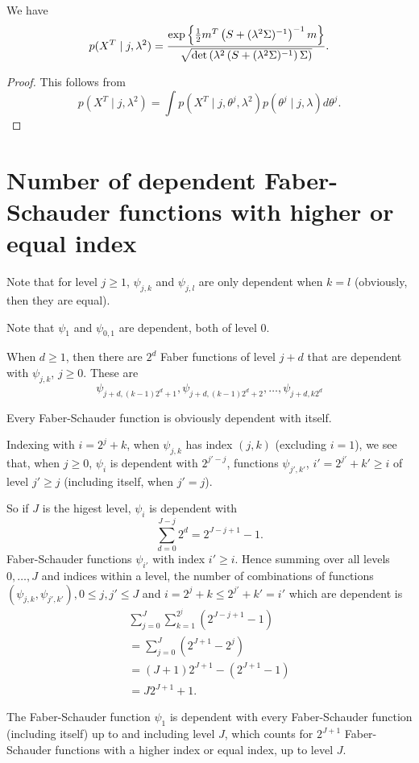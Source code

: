 \documentclass[12pt]{article}
\begin{document}
\begin{lemma}
	We have \[
	p(X^T\mid j,\lambda^2)= \frac{\exp\left\{ \frac12 m^T \left( S+(\lambda^2 \Sigma)^{-1} \right)^{-1}m \right\}}{\sqrt{\det\left( \lambda^2\left( S+(\lambda^2 \Sigma)^{-1} \right)\Sigma \right)}}.
	\]
\end{lemma}
\begin{proof}
	This follows from \[
	p(X^T\mid j,\lambda^2 ) = \int p(X^T\mid j,\theta^j,\lambda^2)p(\theta^j\mid j, \lambda)d\theta^j.
	\]
\end{proof}
\section{Number of dependent Faber-Schauder functions with higher or equal index}

Note that for level \(j\ge 1\), \(\psi_{j,k}\) and \(\psi_{j,l}\) are only dependent when \(k=l\) (obviously, then they are equal). 

Note that \(\psi_1\) and \(\psi_{0,1}\) are dependent, both of level 0. 

When \(d\ge 1\), then there are \(2^d\) Faber functions of level \(j+d\) that are dependent with \(\psi_{j,k}\), \(j\ge 0\). These are 
\[
\psi_{j+d,(k-1)2^d+1},\psi_{j+d,(k-1)2^d+2},\ldots,\psi_{j+d,k2^d}
\]

Every Faber-Schauder function is obviously dependent with itself. 

Indexing with \(i=2^j+k\), when \(\psi_{j,k}\) has index \((j,k)\) (excluding \(i=1\)), we see that, when \(j\ge 0\), \(\psi_i\) is dependent with \(2^{j'-j}\), functions \(\psi_{j',k'}\), \(i'=2^{j'}+k'\ge i\) of level \(j'\ge j\)  (including itself, when \(j'=j\)).

So if \(J\) is the higest level, \(\psi_i\) is dependent with 
\[
\sum_{d=0}^{J-j}2^d=2^{J-j+1}-1.
\]
Faber-Schauder functions \(\psi_{i'}\) with index \(i'\ge i\). 
Hence summing over all levels \(0,\ldots,J\) and indices within a level, the number of combinations of functions \((\psi_{j,k},\psi_{j',k'}),0\le j,j'\le J\) and  \(i=2^j+k\le 2^{j'}+k'=i'\) which are dependent is
\begin{align*}
\sum_{j=0}^J\sum_{k=1}^{2^j}(2^{J-j+1}-1)\\
=\sum_{j=0}^J(2^{J+1}-2^j)\\
=(J+1)2^{J+1}-(2^{J+1}-1)\\
=J2^{J+1}+1. 
\end{align*}

The Faber-Schauder function \(\psi_1\) is dependent with every Faber-Schauder function (including itself) up to and including level \(J\), which counts for \(2^{J+1}\) Faber-Schauder functions with a higher index or equal index, up to level \(J\). 
\end{document}

